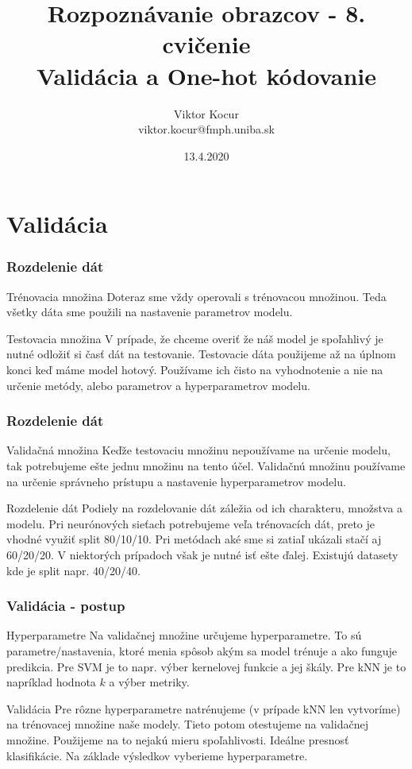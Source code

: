 \documentclass{beamer}
\title[Validácia, One-Hot]{Rozpoznávanie obrazcov - 8. cvičenie \\ Validácia a One-hot kódovanie}
\author[Viktor Kocur]{Viktor Kocur \\{\small viktor.kocur@fmph.uniba.sk}}
\institute{DAI FMFI UK}
\date{13.4.2020}
\begin{document}

\begin{frame}[plain]
  \titlepage  
\end{frame}

\section{Validácia}
\begin{frame}
\frametitle{Rozdelenie dát}
\begin{block}{Trénovacia množina}
Doteraz sme vždy operovali s trénovacou množinou. Teda všetky dáta sme použili na nastavenie parametrov modelu.
\end{block}

\begin{block}{Testovacia množina}
V prípade, že chceme overiť že náš model je spoľahlivý je nutné odložiť si časť dát na testovanie. Testovacie dáta použijeme až na úplnom konci keď máme model hotový. Používame ich čisto na vyhodnotenie a nie na určenie metódy, alebo parametrov a hyperparametrov modelu.
\end{block}
\end{frame}


\begin{frame}
\frametitle{Rozdelenie dát}
\begin{block}{Validačná množina}
Keďže testovaciu množinu nepoužívame na určenie modelu, tak potrebujeme ešte jednu množinu na tento účel. Validačnú množinu používame na určenie správneho prístupu a nastavenie hyperparametrov modelu. 
\end{block}

\begin{block}{Rozdelenie dát}
Podiely na rozdelovanie dát záležia od ich charakteru, množstva a modelu. Pri neurónových sieťach potrebujeme veľa trénovacích dát, preto je vhodné využiť split 80/10/10. Pri metódach aké sme si zatiaľ ukázali stačí aj 60/20/20. V niektorých prípadoch však je nutné isť ešte ďalej. Existujú datasety kde je split napr. 40/20/40.
\end{block}
\end{frame}


\begin{frame}
\frametitle{Validácia - postup}
\begin{block}{Hyperparametre}
Na validačnej množine určujeme hyperparametre. To sú parametre/nastavenia, ktoré menia spôsob akým sa model trénuje a ako funguje predikcia. Pre SVM je to napr. výber kernelovej funkcie a jej škály. Pre kNN je to napríklad hodnota $k$ a výber metriky. 
\end{block}

\begin{block}{Validácia}
Pre rôzne hyperparametre natrénujeme (v prípade kNN len vytvoríme) na trénovacej množine naše modely. Tieto potom otestujeme na validačnej množine.  Použijeme na to nejakú mieru spoľahlivosti. Ideálne presnosť klasifikácie. Na základe výsledkov vyberieme hyperparametre.
\end{block}
\end{frame}
\end{document}
